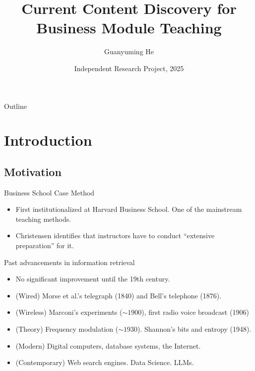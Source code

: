 \documentclass{beamer}
\title
{Current Content Discovery for Business Module Teaching}
\author
{Guanyuming He}
\institute[Imperial College London]
{
  Department of Earth Science and Engineering\\
  Imperial College London
}
\date[IRP 25]
{Independent Research Project, 2025}
\begin{document}
\begin{frame}
  \titlepage
\end{frame}

\begin{frame}{Outline}
  \tableofcontents
\end{frame}





\section{Introduction}

\subsection{Motivation}

\begin{frame}{Business School Case Method}

  \begin{itemize}
  \item
    First institutionalized at Harvard Business School. One of the mainstream
	teaching methods.
  \item
	Christensen identifies that instructors have to conduct ``extensive
	preparation'' for it.
  \end{itemize}
\end{frame}

\begin{frame}{Past advancements in information retrieval}
  \begin{itemize}
	\item No significant improvement until the 19th century.
	\item (Wired) Morse et al.'s telegraph (1840) and Bell's telephone (1876).
	\item (Wireless) Marconi's experiments ($\sim 1900$), first radio voice
		broadcast (1906) 
	\item (Theory) Frequency modulation ($\sim 1930$).  Shannon's bits and
		entropy (1948).   
	\item (Modern) Digital computers, database systems, the Internet.
	\item (Contemporary) Web search engines. Data Science. LLMs.
\end{itemize}
\end{frame}
\end{document}
